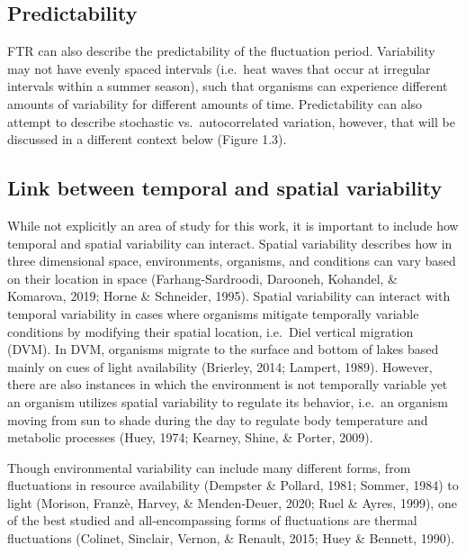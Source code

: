 \documentclass[12pt,twoside]{reedthesis}
\begin{document}
\hypertarget{predictability}{%
\subsection{Predictability}\label{predictability}}

FTR can also describe the predictability of the fluctuation period. Variability may not have evenly spaced intervals (i.e.~heat waves that occur at irregular intervals within a summer season), such that organisms can experience different amounts of variability for different amounts of time. Predictability can also attempt to describe stochastic vs.~autocorrelated variation, however, that will be discussed in a different context below (Figure 1.3).

\hypertarget{link-between-temporal-and-spatial-variability}{%
\subsection{Link between temporal and spatial variability}\label{link-between-temporal-and-spatial-variability}}

While not explicitly an area of study for this work, it is important to include how temporal and spatial variability can interact. Spatial variability describes how in three dimensional space, environments, organisms, and conditions can vary based on their location in space (Farhang-Sardroodi, Darooneh, Kohandel, \& Komarova, 2019; Horne \& Schneider, 1995). Spatial variability can interact with temporal variability in cases where organisms mitigate temporally variable conditions by modifying their spatial location, i.e.~Diel vertical migration (DVM). In DVM, organisms migrate to the surface and bottom of lakes based mainly on cues of light availability (Brierley, 2014; Lampert, 1989). However, there are also instances in which the environment is not temporally variable yet an organism utilizes spatial variability to regulate its behavior, i.e.~an organism moving from sun to shade during the day to regulate body temperature and metabolic processes (Huey, 1974; Kearney, Shine, \& Porter, 2009).

Though environmental variability can include many different forms, from fluctuations in resource availability
(Dempster \& Pollard, 1981; Sommer, 1984) to light (Morison, Franzè, Harvey, \& Menden‐Deuer, 2020; Ruel \& Ayres, 1999), one of the best studied and all-encompassing forms of fluctuations are thermal fluctuations (Colinet, Sinclair, Vernon, \& Renault, 2015; Huey \& Bennett, 1990).
\end{document}
